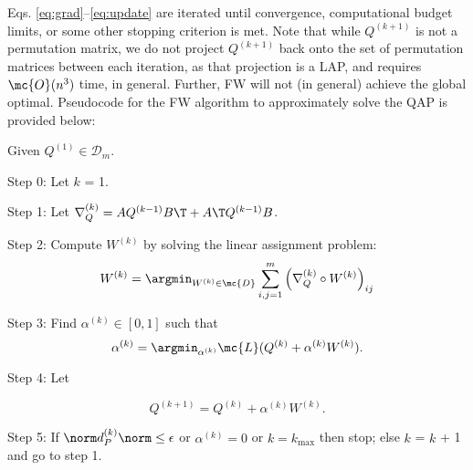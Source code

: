 Eqs. \eqref{eq:grad}--\eqref{eq:update} are iterated until convergence, computational budget limits, or some other stopping criterion is met.  Note that while $Q^{(k+1)}$ is not a permutation matrix, we do not project $Q^{(k+1)}$ back onto the set of permutation matrices between each iteration, as that projection is a LAP, and requires $\mc{O}(n^3)$ time, in general.  Further, 
% 
% 
FW will not (in general) achieve the global optimal.  
Pseudocode for the FW algorithm to approximately solve the QAP is provided below:
\begin{Alg}
Given $ Q^{(1)} \in \mathcal D_m $.
\item {Step 0:} Let $k$ = 1.

\item {Step 1:} Let $\nabla_Q^{(k)} = A Q^{(k-1)} B\T + A\T Q^{(k-1)} B$.  

\item {Step 2:} Compute $W^{(k)}$  by solving the
linear assignment problem:
\begin{align}
	W^{(k)} = \argmin_{W^{(k)} \in \mc{D}} %
	\sum_{i,j=1}^m 
	\left( 
	\nabla_Q^{(k)}\circ W^{(k)}
	 \right)_{ij}
\end{align}
\item {Step 3:} Find $\alpha^{(k)} \in [0,1]$ such that
$$\alpha^{(k)}=\argmin_{\alpha^{(k)}}
\mc{L} (Q^{(k)} + \alpha^{(k)} W^{(k)}).
$$
\item {Step 4:} Let

$$ Q^{(k+1)} = Q^{(k)} + \alpha^{(k)} W^{(k)}. $$
\item {Step 5:} 
If $\norm d^{(k)}_{P} \norm \le \epsilon$ or $\alpha^{(k)}=0$ or $k=k_{\max}$
then stop; else $k$ = $k$ + 1 and go to step 1.
\end{Alg}

